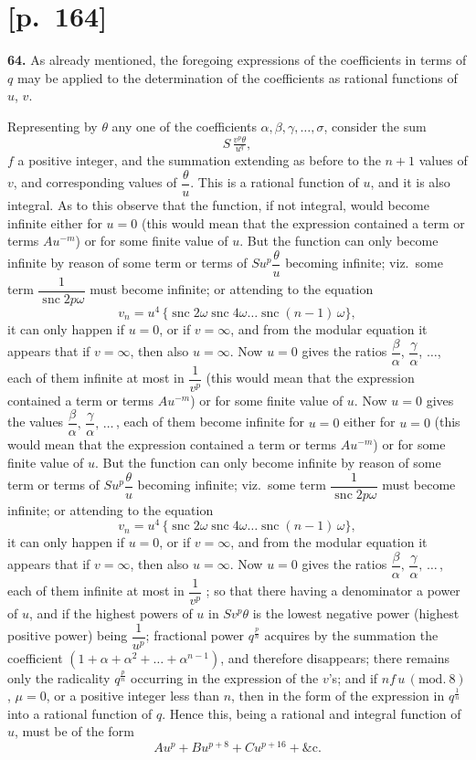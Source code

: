 \documentclass[11pt]{article}
\providecommand{\modd}{\mathrm{mod}}
\begin{document}
\section*{[p.~164]}

\noindent\textbf{64.} As already mentioned, the foregoing expressions of the coefficients in terms
of $q$ may be applied to the determination of the coefficients as rational functions
of $u$, $v$.

Representing by $\theta$ any one of the coefficients $\alpha,\beta,\gamma,\ldots,\sigma$, consider the sum
\[
S\,\tfrac{v^p\theta}{u^q},
\]
$f$ a positive integer, and the summation extending as before to the $n+1$ values of
$v$, and corresponding values of $\dfrac{\theta}{u}$. This is a rational function of $u$, and it is also
integral. As to this observe that the function, if not integral, would become infinite
either for $u=0$ (this would mean that the expression contained a term or terms
$Au^{-m}$) or for some finite value of $u$. But the function can only become infinite by
reason of some term or terms of $Su^p\dfrac{\theta}{u}$ becoming infinite; viz.\ some term $\dfrac{1}{\operatorname{snc}2p\omega}$
must become infinite; or attending to the equation
\[
v_n=u^4\,\{\operatorname{snc}2\omega\operatorname{snc}4\omega\ldots\operatorname{snc}(n-1)\,\omega\},
\]
it can only happen if $u=0$, or if $v=\infty$, and from the modular equation it appears
that if $v=\infty$, then also $u=\infty$. Now $u=0$ gives the ratios $\dfrac{\beta}{\alpha}$, $\dfrac{\gamma}{\alpha}$, $\ldots$, each of them
infinite at most in $\dfrac{1}{v^p}$ (this would mean that the expression contained a term or terms
$Au^{-m}$) or for some finite value of $u$. Now $u=0$ gives the values $\dfrac{\beta}{\alpha},\,\dfrac{\gamma}{\alpha},\,\ldots\,$, each of them
become infinite for $u=0$ either for $u=0$ (this would mean that the expression contained a term or terms
$Au^{-m}$) or for some finite value of $u$. But the function can only become infinite by
reason of some term or terms of $Su^p\dfrac{\theta}{u}$ becoming infinite; viz.\ some term $\dfrac{1}{\operatorname{snc}2p\omega}$
must become infinite; or attending to the equation
\[
v_n=u^4\,\{\operatorname{snc}2\omega\operatorname{snc}4\omega\ldots\operatorname{snc}(n-1)\,\omega\},
\]
it can only happen if $u=0$, or if $v=\infty$, and from the modular equation it appears
that if $v=\infty$, then also $u=\infty$. Now $u=0$ gives the ratios $\dfrac{\beta}{\alpha},\,\dfrac{\gamma}{\alpha},\,\ldots\,$, each of them
infinite at most in $\dfrac{1}{v^p}$ ; so that there having a denominator a power of $u$, and if the highest
powers of $u$ in $S v^p\theta$ is the lowest negative power (highest positive power) being $\dfrac{1}{u^{p}}$;
fractional power $q^{\frac{p}{n}}$ acquires by the summation the coefficient $(1+\alpha+\alpha^2+\ldots+\alpha^{n-1})$, and
therefore disappears; there remains only the radicality $q^{\frac{p}{n}}$ occurring in the expression
of the $v$'s; and if $nf\,u\,(\modd.\ 8)$, $\mu=0$, or a positive integer less than $n$, then in the
form of the expression in $q^{\frac{1}{n}}$ into a rational function of $q$. Hence this, being a
rational and integral function of $u$, must be of the form
\[
Au^{p}+Bu^{p+8}+Cu^{p+16}+\&\text{c.}
\]
\end{document}
